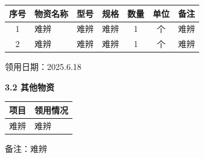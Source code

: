 \documentclass[UTF8,10pt,a4paper,fontset=fandol]{ctexart}
\newcommand{\fieldvalue}[1]{#1}
\newcommand{\handwritten}[1]{#1}
\begin{document}
\begin{tabularx}{\textwidth}{c|X|X|X|c|c|X}
\hline
序号 & 物资名称 & 型号 & 规格 & 数量 & 单位 & 备注\\
\hline
1 &
\fieldvalue{\handwritten{难辨}} &
\fieldvalue{\handwritten{难辨}} &
\fieldvalue{\handwritten{难辨}} &
\fieldvalue{\handwritten{1}} &
个 &
\fieldvalue{\handwritten{难辨}}\\
\hline
2 &
\fieldvalue{\handwritten{难辨}} &
\fieldvalue{\handwritten{难辨}} &
\fieldvalue{\handwritten{难辨}} &
\fieldvalue{\handwritten{1}} &
个 &
\fieldvalue{\handwritten{难辨}}\\
\hline
\end{tabularx}

\noindent
领用日期：\fieldvalue{\handwritten{2025.6.18}}

\bigskip

\noindent
\textbf{3.2 其他物资}

\begin{tabularx}{\textwidth}{X|X}
\hline
项目 & 领用情况\\
\hline
\fieldvalue{\handwritten{难辨}} &
\fieldvalue{\handwritten{难辨}}\\
\hline
\end{tabularx}

\noindent
备注：\fieldvalue{\handwritten{难辨}}
\end{document}
